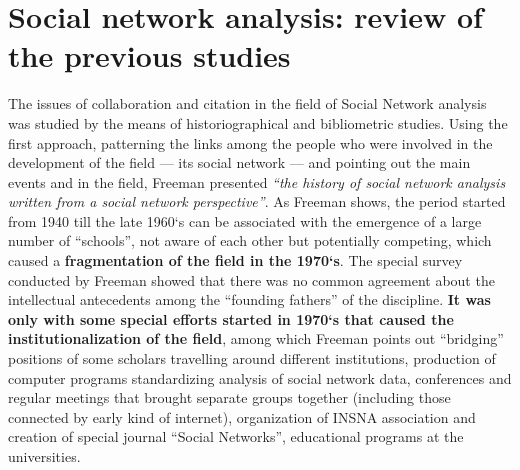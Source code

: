 \documentclass[11pt]{article} %
\begin{document}


\section{Social network analysis: review of the previous studies}

The issues of collaboration and citation in the field of Social Network analysis was studied by the means of historiographical and bibliometric studies. 
Using the first approach, patterning the links among the people who were involved in the development of the field — its social network — and pointing out the main events and in the field, Freeman \citep{SNAdev} presented \textit{“the history of social network analysis written from a social network perspective”}. As Freeman shows, the period started from 1940 till the late 1960`s can be associated with the emergence of a large number of “schools”, not aware of each other but potentially competing, which caused a \textbf{fragmentation of the field in the 1970`s}. The special survey conducted by Freeman showed that there was no common agreement about the intellectual antecedents among the “founding fathers” of the discipline. \textbf{It was only with some special efforts started in 1970`s that caused the institutionalization of the field}, among which Freeman points out “bridging” positions of some scholars travelling around different institutions, production of computer programs standardizing analysis of social network data, conferences and regular meetings that brought separate groups together (including those connected by early kind of internet), organization of INSNA association and creation of special journal “Social Networks”, educational programs at the universities. \medskip 
\end{document}
